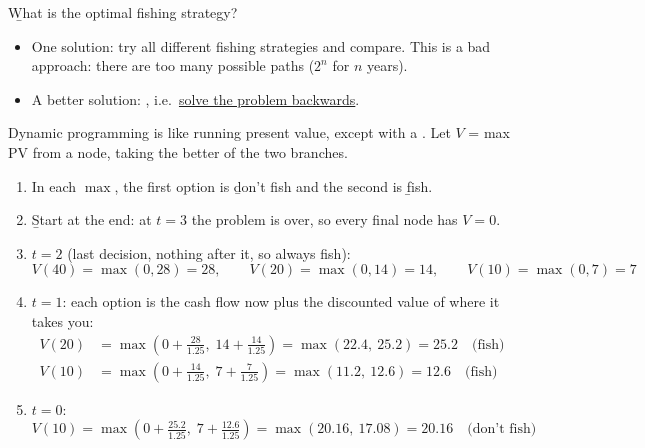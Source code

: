 \begin{center}
\end{center}

\b{What is the optimal fishing strategy?}
\begin{itemize}
    \item One solution: try all different fishing strategies and compare. This is a bad approach: there are too many possible paths ($2^n$ for $n$ years).
    \item A better solution: , i.e.\ \ul{solve the problem backwards}.
\end{itemize}

Dynamic programming is like running present value, except with a . Let $V$ = max PV from a node, taking the better of the two branches.
\begin{enumerate}
    \item In each $\max$, the first option is \b{don't fish} and the second is \b{fish}.
    \item \b{Start at the end}: at $t = 3$ the problem is over, so every final node has $V = 0$.
    \item \b{$t = 2$} (last decision, nothing after it, so always fish):
    \[V(40) = \max(0, 28) = 28, \qquad V(20) = \max(0, 14) = 14, \qquad V(10) = \max(0, 7) = 7\]
    \item \b{$t = 1$}: each option is the cash flow now plus the discounted value of where it takes you:
    \begin{align*}
        V(20) &= \max\left(0 + \tfrac{28}{1.25},\; 14 + \tfrac{14}{1.25}\right) = \max(22.4,\ 25.2) = 25.2 \quad \text{(fish)}\\
        V(10) &= \max\left(0 + \tfrac{14}{1.25},\; 7 + \tfrac{7}{1.25}\right) = \max(11.2,\ 12.6) = 12.6 \quad \text{(fish)}
    \end{align*}
    \item \b{$t = 0$}:
    \[V(10) = \max\left(0 + \tfrac{25.2}{1.25},\; 7 + \tfrac{12.6}{1.25}\right) = \max(20.16,\ 17.08) = \boxed{20.16} \quad \text{(don't fish)}\]
\end{enumerate}


